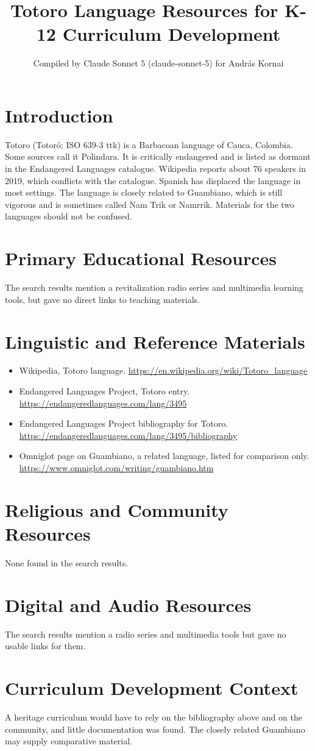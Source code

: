 \documentclass[12pt]{article}
\title{Totoro Language Resources for K-12 Curriculum Development}
\author{Compiled by Claude Sonnet 5 (claude-sonnet-5) for Andr\'as Kornai}
\date{}
\begin{document}
\maketitle
\section{Introduction}
Totoro (Totor\'o; ISO 639-3 ttk) is a Barbacoan language of Cauca, Colombia. Some sources call it Polindara. It is critically endangered and is listed as dormant in the Endangered Languages catalogue. Wikipedia reports about 76 speakers in 2019, which conflicts with the catalogue. Spanish has displaced the language in most settings. The language is closely related to Guambiano, which is still vigorous and is sometimes called Nam Trik or Namrrik. Materials for the two languages should not be confused.
\section{Primary Educational Resources}
The search results mention a revitalization radio series and multimedia learning tools, but gave no direct links to teaching materials.
\section{Linguistic and Reference Materials}
\begin{itemize}
\item Wikipedia, Totoro language. \url{https://en.wikipedia.org/wiki/Totoro_language}
\item Endangered Languages Project, Totoro entry. \url{https://endangeredlanguages.com/lang/3495}
\item Endangered Languages Project bibliography for Totoro. \url{https://endangeredlanguages.com/lang/3495/bibliography}
\item Omniglot page on Guambiano, a related language, listed for comparison only. \url{https://www.omniglot.com/writing/guambiano.htm}
\end{itemize}
\section{Religious and Community Resources}
None found in the search results.
\section{Digital and Audio Resources}
The search results mention a radio series and multimedia tools but gave no usable links for them.
\section{Curriculum Development Context}
A heritage curriculum would have to rely on the bibliography above and on the community, and little documentation was found. The closely related Guambiano may supply comparative material.
\end{document}
